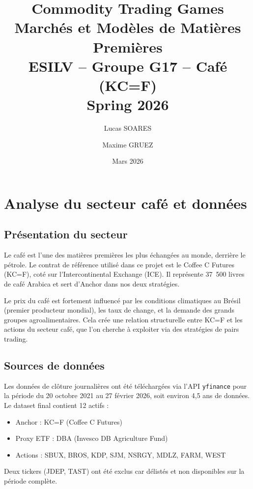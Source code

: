\documentclass[12pt, a4paper]{article}
\title{
    \vspace{-1cm}
    \Large \textbf{Commodity Trading Games} \\[0.4em]
    \large Marchés et Modèles de Matières Premières \\[0.4em]
    \normalsize ESILV -- Groupe G17 -- Café (KC=F) \\[0.4em]
    \normalsize Spring 2026
}
\author{Lucas SOARES \and Maxime GRUEZ}
\date{Mars 2026}
\begin{document}
\maketitle
\tableofcontents
\newpage

\section{Analyse du secteur café et données}

\subsection{Présentation du secteur}

Le café est l'une des matières premières les plus échangées au monde, derrière le
pétrole. Le contrat de référence utilisé dans ce projet est le Coffee C
Futures (KC=F), coté sur l'Intercontinental Exchange (ICE). Il représente
37~500 livres de café Arabica et sert d'Anchor dans nos deux stratégies.

Le prix du café est fortement influencé par les conditions climatiques au Brésil
(premier producteur mondial), les taux de change, et la demande des grands groupes
agroalimentaires. Cela crée une relation structurelle entre KC=F et les actions
du secteur café, que l'on cherche à exploiter via des stratégies de pairs trading.

\subsection{Sources de données}

Les données de clôture journalières ont été téléchargées via l'API
\texttt{yfinance} pour la période du 20 octobre 2021 au 27 février 2026,
soit environ 4,5 ans de données. Le dataset final contient 12 actifs :

\begin{itemize}
    \item Anchor : KC=F (Coffee C Futures)
    \item Proxy ETF : DBA (Invesco DB Agriculture Fund)
    \item Actions : SBUX, BROS, KDP, SJM, NSRGY, MDLZ, FARM, WEST
\end{itemize}

Deux tickers (JDEP, TAST) ont été exclus car délistés et non disponibles sur
la période complète.
\end{document}
